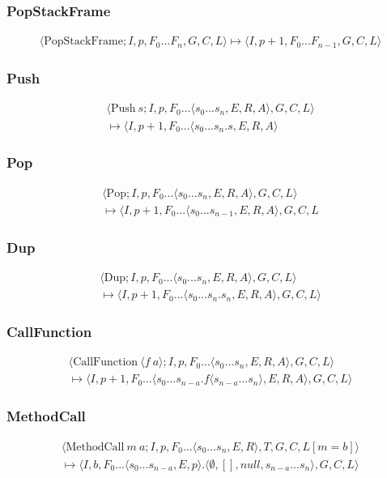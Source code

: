 \subsubsection{PopStackFrame}
\begin{multline*}
\langle \text{PopStackFrame}; I, p, F_0...F_n, G, C, L\rangle \mapsto \langle I, p+1, F_0...F_{n-1}, G, C, L\rangle 
\end{multline*}
\subsubsection{Push}

\begin{multline*}
\langle \text{Push}\ s; I, p, F_0...\langle s_0...s_n, E, R, A\rangle , G, C, L\rangle  \\ \mapsto \langle I, p+1, F_0...\langle s_0...s_n.s, E, R, A\rangle 
\end{multline*}

\subsubsection{Pop}
\begin{multline*}
\langle \text{Pop}; I, p, F_0...\langle s_0...s_n, E, R, A\rangle , G, C, L\rangle  \\ \mapsto \langle I, p+1, F_0...\langle s_0...s_{n-1}, E, R,  A\rangle , G, C, L
\end{multline*}
\subsubsection{Dup}
\begin{multline*}
\langle \text{Dup}; I, p, F_0...\langle s_0...s_n, E, R, A\rangle , G, C, L\rangle  \\ \mapsto \langle I, p+1, F_0...\langle s_0...s_n.s_n, E, R, A\rangle , G, C, L\rangle 
\end{multline*}
\subsubsection{CallFunction}
\begin{multline*}
\langle \text{CallFunction}\ \langle f\ a\rangle ; I, p, F_0...\langle s_0...s_n, E, R, A\rangle , G, C, L\rangle  \\ \mapsto \langle I, p+1, F_0...\langle s_0...s_{n-a}.f\langle s_{n-a}...s_n\rangle , E, R, A\rangle , G, C, L\rangle 
\end{multline*}
\subsubsection{MethodCall}
\begin{multline*}
\langle \text{MethodCall}\ m \ a; I, p, F_0...\langle s_0...s_n, E, R\rangle , T, G, C, L[m=b]\rangle  \\ \mapsto \langle I, b, F_0...\langle s_0...s_{n-a}, E, p\rangle .\langle \emptyset, [], null, s_{n-a}...s_n\rangle , G, C, L\rangle 
\end{multline*}

